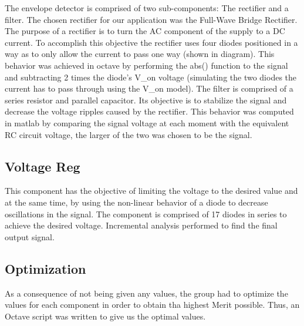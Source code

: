 The envelope detector is comprised of two sub-components: The rectifier and a filter.
The chosen rectifier for our application was the Full-Wave Bridge Rectifier. The purpose of a rectifier is to turn the AC component of the supply to a DC current. To accomplish this objective the rectifier uses four diodes positioned in a way as to only allow the current to pass one way (shown in diagram).
This behavior was achieved in octave by performing the abs() function to the signal and subtracting 2 times the diode’s V_on voltage (simulating the two diodes the current has to pass through using the V_on model).
The filter is comprised of a series resistor and parallel capacitor. Its objective is to stabilize the signal and decrease the voltage ripples caused by the rectifier. This behavior was computed in matlab by comparing the signal voltage at each moment with the equivalent RC circuit voltage, the larger of the two was chosen to be the signal.


\subsection{Voltage Reg}
\label{subsec:voltreg}

This component has the objective of limiting the voltage to the desired value and at the same time, by using the non-linear behavior of a diode to decrease oscillations in the signal.
The component is comprised of 17 diodes in series to achieve the desired voltage.
Incremental analysis performed to find the final output signal.


\subsection{Optimization}
\label{subsec:optim}

As a consequence of not being given any values, the group had to optimize the values
for each component in order to obtain tha highest Merit possible. Thus, an Octave script
was written to give us the optimal values.


